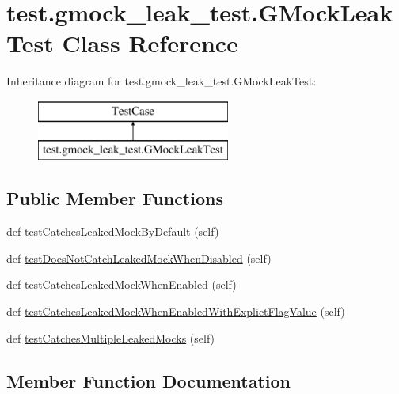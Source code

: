 \hypertarget{classtest_1_1gmock__leak__test_1_1_g_mock_leak_test}{}\section{test.\+gmock\+\_\+leak\+\_\+test.\+G\+Mock\+Leak\+Test Class Reference}
\label{classtest_1_1gmock__leak__test_1_1_g_mock_leak_test}
Inheritance diagram for test.\+gmock\+\_\+leak\+\_\+test.\+G\+Mock\+Leak\+Test\+:\begin{figure}[H]
\begin{center}
\leavevmode
\includegraphics[height=2.000000cm]{db/dd2/classtest_1_1gmock__leak__test_1_1_g_mock_leak_test}
\end{center}
\end{figure}
\subsection*{Public Member Functions}
\begin{DoxyCompactItemize}
\item 
def \mbox{\hyperlink{classtest_1_1gmock__leak__test_1_1_g_mock_leak_test_a941ebf299805c6d5c7450f79c6f8e532}{test\+Catches\+Leaked\+Mock\+By\+Default}} (self)
\item 
def \mbox{\hyperlink{classtest_1_1gmock__leak__test_1_1_g_mock_leak_test_acd94a559f04bfe2bdf85217e19a8f0aa}{test\+Does\+Not\+Catch\+Leaked\+Mock\+When\+Disabled}} (self)
\item 
def \mbox{\hyperlink{classtest_1_1gmock__leak__test_1_1_g_mock_leak_test_af1d815f0833dfbab8e761ec98012c6e6}{test\+Catches\+Leaked\+Mock\+When\+Enabled}} (self)
\item 
def \mbox{\hyperlink{classtest_1_1gmock__leak__test_1_1_g_mock_leak_test_a4da65de01bb7132b045350557f5b38fa}{test\+Catches\+Leaked\+Mock\+When\+Enabled\+With\+Explict\+Flag\+Value}} (self)
\item 
def \mbox{\hyperlink{classtest_1_1gmock__leak__test_1_1_g_mock_leak_test_a41a547f4101a83e3df6818466d9b2839}{test\+Catches\+Multiple\+Leaked\+Mocks}} (self)
\end{DoxyCompactItemize}


\subsection{Member Function Documentation}
\mbox{\label{classtest_1_1gmock__leak__test_1_1_g_mock_leak_test_a941ebf299805c6d5c7450f79c6f8e532}} 
